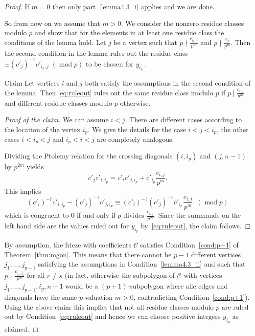 \documentclass[ALCO,ThmDefs,Unicode,epreuves,published]{cedram}
\numberwithin{equation}{section}
\DeclareMathOperator{\md}{mod}
\begin{document}
\begin{proof}
If $m=0$ then only part~\ref{lemma4.3_i} applies and we are done. 

So from now on we assume that $m>0$.
We consider the nonzero residue classes modulo $p$ and show that for the elements in at least one
residue class the conditions of the lemma hold. Let $j$ be a vertex such that
$p\nmid \frac{c_{i_p,j}}{p^m}$ and $p\nmid \frac{c_{j}}{p^m}$. Then the second condition 
in the lemma rules out the residue class 
$\pm (c'_j)^{-1} c'_{i_p,j}\,\,(\md p)$ to be chosen for $y_{i_p}$.


\begin{enonce*}{Claim} Let vertices $i$ and $j$ both satisfy the assumptions in the second
condition of the lemma. Then 
\eqref{eq:ruleout} rules out the same residue class modulo $p$
if
$p\mid \frac{c_{i,j}}{p^m}$ and different residue classes modulo $p$ otherwise. 
\end{enonce*}

\begin{proof}[Proof of the claim] We can assume $i<j$. There are different cases according
to the location of the vertex $i_p$. We give the details for the case $i<j<i_p$,
the other cases $i<i_p<j$ and $i_p<i<j$ are completely analogous. 

Dividing the Ptolemy relation for the crossing diagonals $(i,i_p)$ and $(j,n-1)$
by $p^{2m}$ yields 
\[
c'_j c'_{i,i_p} = c'_i c'_{j,i_p} + c'_{i_p} \frac{c_{i,j}}{p^m}.
\]
This implies 
\[
(c'_i)^{-1}c'_{i,i_p} - (c'_j)^{-1}c'_{j,i_p} \equiv 
(c'_i)^{-1}(c'_j)^{-1}c'_{i_p} \frac{c_{i,j}}{p^m}\,\,\,
(\md  p)
\]
which is congruent to 0 if and only if $p$ divides $\frac{c_{i,j}}{p^m}$. Since 
the summands on the left hand side are the values ruled out for $y_{i_p}$
by~\eqref{eq:ruleout}, the claim follows.\let\qed\relax 
\end{proof}

By assumption, the frieze with coefficients $\mathcal{C}$ satisfies Condition~\eqref{cond:p+1} of Theorem~\ref{thm:mgon}.
This means that there cannot be $p-1$ different 
vertices 
$j_1,\ldots, j_{p-1}$ satisfying the assumptions in Condition~\ref{lemma4.3_ii}
and such that
$p\nmid \frac{c_{j_r,j_s}}{p^m}$ for all $r\neq s$ (in fact, 
otherwise the subpolygon of $\mathcal{C}$ with vertices 
$j_1,\ldots,j_{p-1}, i_p, n-1$ would be a $(p+1)$-subpolygon
where alle edges and diagonals have the same $p$-valuation $m>0$, contradicting Condition~\eqref{cond:p+1}).
Using the above claim this implies that not all residue 
classes modulo $p$ are ruled out by Condition~\eqref{eq:ruleout}
and hence we can choose positive integers $y_{i_p}$
as claimed.
\end{proof}
\end{document}
